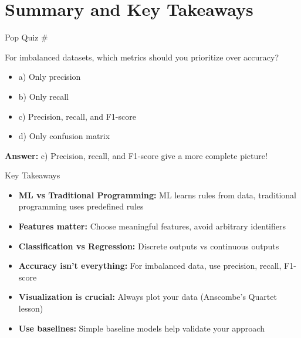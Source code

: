 \documentclass[usenames,dvipsnames]{beamer}
\begin{document}
\section{Summary and Key Takeaways}

\begin{frame}{Pop Quiz \#\thepopquiz}
\begin{popquizbox}{\thepopquiz}
For imbalanced datasets, which metrics should you prioritize over accuracy?
\begin{itemize}
	\item a) Only precision
	\item b) Only recall
	\item c) Precision, recall, and F1-score
	\item d) Only confusion matrix
\end{itemize}
\pause
\textbf{Answer:} c) Precision, recall, and F1-score give a more complete picture!
\end{popquizbox}
\end{frame}

\begin{frame}{Key Takeaways}
\begin{keypointsbox}
\begin{itemize}
	\item \textbf{ML vs Traditional Programming:} ML learns rules from data, traditional programming uses predefined rules
	\item \textbf{Features matter:} Choose meaningful features, avoid arbitrary identifiers
	\item \textbf{Classification vs Regression:} Discrete outputs vs continuous outputs
	\item \textbf{Accuracy isn't everything:} For imbalanced data, use precision, recall, F1-score
	\item \textbf{Visualization is crucial:} Always plot your data (Anscombe's Quartet lesson)
	\item \textbf{Use baselines:} Simple baseline models help validate your approach
\end{itemize}
\end{keypointsbox}
\end{frame}
\end{document}
